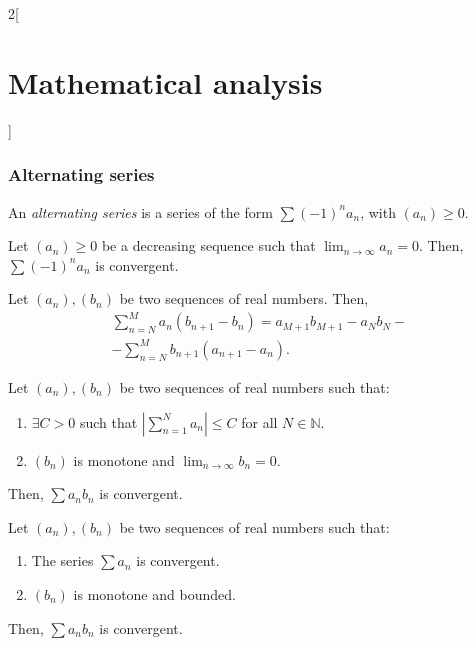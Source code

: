 \documentclass[../../../main.tex]{subfiles}
\begin{document}
\begin{multicols}{2}[\section{Mathematical analysis}]
\subsubsection*{Alternating series}
\begin{definition}
An \textit{alternating series} is a series of the form $\sum (-1)^na_n$, with $(a_n)\geq 0$.
\end{definition}
\begin{theorem}
Let $(a_n)\geq 0$ be a decreasing sequence such that $\displaystyle\lim_{n\to\infty}a_n=0$. Then, $\sum (-1)^na_n$ is convergent.
\end{theorem}
\begin{theorem}
Let $(a_n),(b_n)$ be two sequences of real numbers. Then, 
\begin{multline*}
\sum_{n=N}^M a_n(b_{n+1}-b_n)=a_{M+1}b_{M+1}-a_Nb_N-\\
-\sum_{n=N}^Mb_{n+1}(a_{n+1}-a_n).
\end{multline*}
\end{theorem}
\begin{theorem}
Let $(a_n),(b_n)$ be two sequences of real numbers such that:
\begin{enumerate}
    \item $\exists C>0$ such that $\displaystyle\left|\sum_{n=1}^Na_n\right|\leq C$ for all $N\in\mathbb{N}$.
    \item $(b_n)$ is monotone and $\displaystyle\lim_{n\to\infty}b_n=0$.
\end{enumerate}
Then, $\sum a_nb_n$ is convergent.
\end{theorem}
\begin{theorem}
Let $(a_n),(b_n)$ be two sequences of real numbers such that:
\begin{enumerate}
    \item The series $\sum a_n$ is convergent.
    \item $(b_n)$ is monotone and bounded.
\end{enumerate}
Then, $\sum a_nb_n$ is convergent.
\end{theorem}

\end{multicols}
\end{document}
